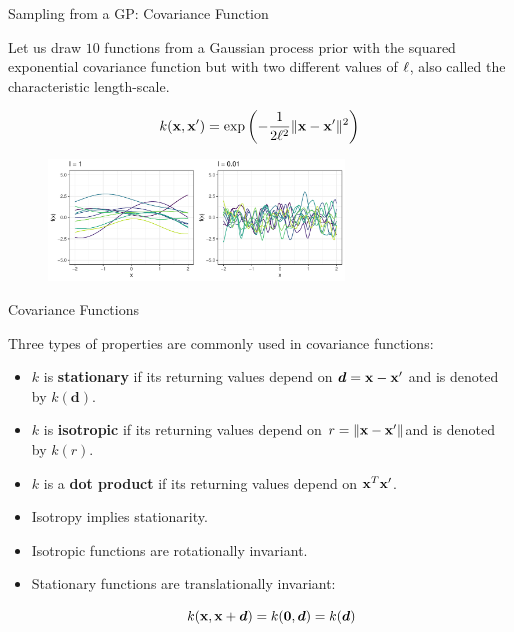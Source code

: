\begin{frame}[c]{Sampling from a GP: Covariance Function}

Let us draw $10$ functions from a Gaussian process prior with the squared exponential covariance function but with two different values of $\ell$, also called the characteristic length-scale.

$$k(\mathbf{x}, \mathbf{x}^\prime) = \exp\left(-\frac{1}{2\ell^2}\|\mathbf{x} - \mathbf{x}^\prime\|^2\right)$$

\begin{figure}
\includegraphics[width=0.7\textwidth]{figure_man/gp-sqexp-l-1.pdf}
\end{figure}

\end{frame}

\begin{frame}[c]{Covariance Functions}

Three types of properties are commonly used in covariance functions:

\lz

\begin{itemize}
\item $k$ is \textbf{stationary} if its returning values depend on $\bm{d} =\mathbf{x} -\mathbf{x}^\prime$ and is denoted by $k(\bm{d})$.

\item $k$ is \textbf{isotropic} if its returning values depend on $r = \|\mathbf{x} - \mathbf{x}^\prime\|$and is denoted by $k(r)$.

\item $k$ is a \textbf{dot product} if its returning values depend on $\mathbf{x}^T \mathbf{x}^\prime$.
\end{itemize}

\lz
\lz

\begin{itemize}
\item[\faLightbulbO] Isotropy implies stationarity.
\item[\faLightbulbO] Isotropic functions are rotationally invariant.
\item[\faLightbulbO] Stationary functions are translationally invariant:
\vspace{-.3cm}

$$k(\mathbf{x},\mathbf{x} + \bm{d}) = k(\bm{0},\bm{d})=k(\bm{d})$$
\end{itemize}

\end{frame}

